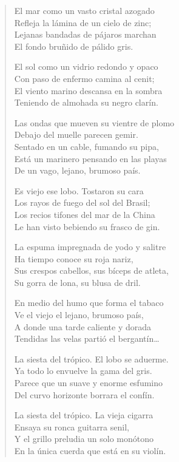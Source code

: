 \documentclass[12pt]{article}
\begin{document}
\clearpage
{}
\begin{verse}

El mar como un vasto cristal azogado\\
Refleja la lámina de un cielo de zinc;\\
Lejanas bandadas de pájaros marchan\\
El fondo bruñido de pálido gris.  

El sol como un vidrio redondo y opaco\\
Con paso de enfermo camina al cenit;\\
El viento marino descansa en la sombra\\
Teniendo de almohada su negro clarín.  

Las ondas que mueven su vientre de plomo\\
Debajo del muelle parecen gemir.\\
Sentado en un cable, fumando su pipa,\\
Está un marinero pensando en las playas\\
De un vago, lejano, brumoso país.  

Es viejo ese lobo. Tostaron su cara\\
Los rayos de fuego del sol del Brasil;\\
Los recios tifones del mar de la China\\
Le han visto bebiendo su frasco de gin.  

La espuma impregnada de yodo y salitre\\
Ha tiempo conoce su roja nariz,\\
Sus crespos cabellos, sus bíceps de atleta,\\
Su gorra de lona, su blusa de dril.  

En medio del humo que forma el tabaco\\
Ve el viejo el lejano, brumoso país,\\
A donde una tarde caliente y dorada\\
Tendidas las velas partió el bergantín…  

La siesta del trópico. El lobo se aduerme.\\
Ya todo lo envuelve la gama del gris.\\
Parece que un suave y enorme esfumino\\
Del curvo horizonte borrara el confín.  

La siesta del trópico. La vieja cigarra\\
Ensaya su ronca guitarra senil,\\
Y el grillo preludia un solo monótono\\
En la única cuerda que está en su violín.  

\end{verse}
\end{document}
